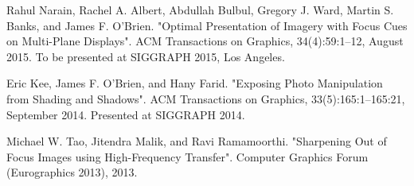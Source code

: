 \documentclass[conference]{IEEEtran}
\begin{document}
\begin{thebibliography}{00}
 Rahul Narain, Rachel A. Albert, Abdullah Bulbul, Gregory J. Ward, Martin S. Banks, and James F. O'Brien. "Optimal Presentation of Imagery with Focus Cues on Multi-Plane Displays". ACM Transactions on Graphics, 34(4):59:1–12, August 2015. To be presented at SIGGRAPH 2015, Los Angeles.

 Eric Kee, James F. O'Brien, and Hany Farid. "Exposing Photo Manipulation from Shading and Shadows". ACM Transactions on Graphics, 33(5):165:1–165:21, September 2014. Presented at SIGGRAPH 2014.

 Michael W. Tao, Jitendra Malik, and Ravi Ramamoorthi. "Sharpening Out of Focus Images using High-Frequency Transfer". Computer Graphics Forum (Eurographics 2013), 2013.

\end{thebibliography}
\end{document}
